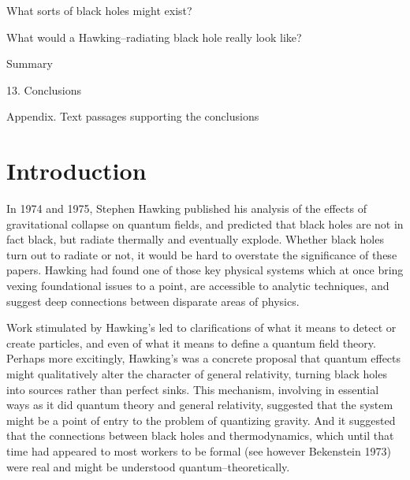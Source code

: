 What sorts of black holes might exist?

 What would a Hawking--radiating black hole really look
like?

 Summary

13. Conclusions

Appendix.  Text passages supporting the conclusions

\vfill\eject

\section{Introduction}

In 1974 and 1975, Stephen Hawking published his analysis of the
effects of gravitational collapse on quantum fields, and predicted
that black holes are not in fact black, but radiate thermally and
eventually explode.  Whether black holes turn out to radiate or not,
it would be hard to overstate the significance of these papers.
Hawking had found one of those key physical systems which at once
bring vexing foundational issues to a point, are accessible to
analytic techniques, and suggest deep connections between
disparate areas of physics.  

Work stimulated by Hawking's led to clarifications of what it means to detect
or create particles, and even of what it means to define a quantum field
theory.  Perhaps more excitingly, Hawking's was a concrete proposal that
quantum effects might qualitatively alter the character of general relativity,
turning black holes into sources rather than perfect sinks.   This mechanism,
involving in essential ways as it did quantum theory and general relativity,
suggested that the system might be a point of entry to the problem of
quantizing gravity. And it suggested that the connections between black holes
and thermodynamics, which until that time had appeared to most workers to be
formal (see however Bekenstein 1973) were real and might be understood
quantum--theoretically. 

